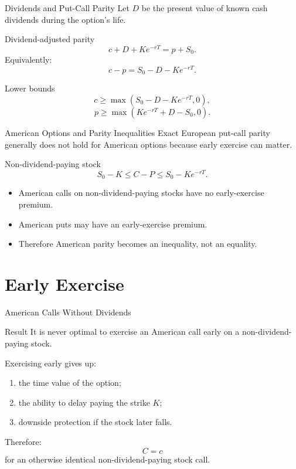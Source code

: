 \documentclass[aspectratio=169,11pt]{beamer}
\begin{document}
\begin{frame}{Dividends and Put-Call Parity}
    Let \(D\) be the present value of known cash dividends during the option's life.

    \begin{block}{Dividend-adjusted parity}
        \[
            c+D+Ke^{-rT}=p+S_0.
        \]
        Equivalently:
        \[
            c-p=S_0-D-Ke^{-rT}.
        \]
    \end{block}

    \begin{block}{Lower bounds}
        \[
            c\geq \max(S_0-D-Ke^{-rT},0),
        \]
        \[
            p\geq \max(Ke^{-rT}+D-S_0,0).
        \]
    \end{block}
\end{frame}

\begin{frame}{American Options and Parity Inequalities}
    Exact European put-call parity generally does not hold for American options because early exercise can matter.

    \begin{block}{Non-dividend-paying stock}
        \[
            S_0-K\leq C-P\leq S_0-Ke^{-rT}.
        \]
    \end{block}

    \begin{itemize}
        \item American calls on non-dividend-paying stocks have no early-exercise premium.
        \item American puts may have an early-exercise premium.
        \item Therefore American parity becomes an inequality, not an equality.
    \end{itemize}
\end{frame}

\section{Early Exercise}

\begin{frame}{American Calls Without Dividends}
    \begin{alertblock}{Result}
        It is never optimal to exercise an American call early on a non-dividend-paying stock.
    \end{alertblock}

    Exercising early gives up:
    \begin{enumerate}
        \item the time value of the option;
        \item the ability to delay paying the strike \(K\);
        \item downside protection if the stock later falls.
    \end{enumerate}

    \vspace{0.6em}
    Therefore:
    \[
        C=c
    \]
    for an otherwise identical non-dividend-paying stock call.
\end{frame}
\end{document}
